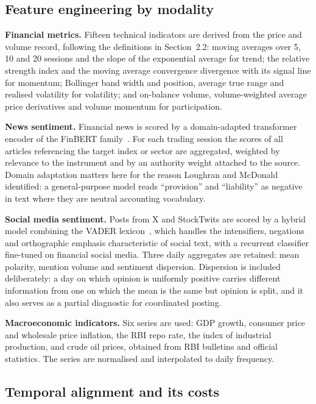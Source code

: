 \subsection{Feature engineering by modality}

\textbf{Financial metrics.} Fifteen technical indicators are derived from the price and volume
record, following the definitions in Section~2.2: moving averages over 5, 10 and 20 sessions and
the slope of the exponential average for trend; the relative strength index and the moving
average convergence divergence with its signal line for momentum; Bollinger band width and
position, average true range and realised volatility for volatility; and on-balance volume,
volume-weighted average price derivatives and volume momentum for participation.

\textbf{News sentiment.} Financial news is scored by a domain-adapted transformer encoder of the
FinBERT family~\cite{araci2019}. For each trading session the scores of all articles referencing
the target index or sector are aggregated, weighted by relevance to the instrument and by an
authority weight attached to the source. Domain adaptation matters here for the reason Loughran
and McDonald~\cite{loughran2011} identified: a general-purpose model reads ``provision'' and
``liability'' as negative in text where they are neutral accounting vocabulary.

\textbf{Social media sentiment.} Posts from X and StockTwits are scored by a hybrid model
combining the VADER lexicon~\cite{hutto2014}, which handles the intensifiers, negations and
orthographic emphasis characteristic of social text, with a recurrent classifier fine-tuned on
financial social media. Three daily aggregates are retained: mean polarity, mention volume and
sentiment dispersion. Dispersion is included deliberately: a day on which opinion is uniformly
positive carries different information from one on which the mean is the same but opinion is
split, and it also serves as a partial diagnostic for coordinated posting.

\textbf{Macroeconomic indicators.} Six series are used: GDP growth, consumer price and wholesale
price inflation, the RBI repo rate, the index of industrial production, and crude oil prices,
obtained from RBI bulletins and official statistics. The series are normalised and interpolated
to daily frequency.

\subsection{Temporal alignment and its costs}

